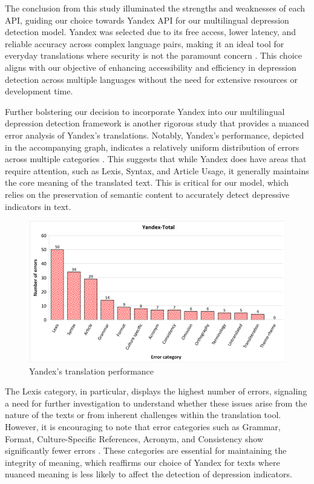 The conclusion from this study illuminated the strengths and weaknesses of each API, guiding our choice towards Yandex API for our multilingual depression detection model. Yandex was selected due to its free access, lower latency, and reliable accuracy across complex language pairs, making it an ideal tool for everyday translations where security is not the paramount concern \cite{rashmi2020comparison}. This choice aligns with our objective of enhancing accessibility and efficiency in depression detection across multiple languages without the need for extensive resources or development time.

Further bolstering our decision to incorporate Yandex into our multilingual depression detection framework is another rigorous study that provides a nuanced error analysis of Yandex's translations. Notably, Yandex's performance, depicted in the accompanying graph, indicates a relatively uniform distribution of errors across multiple categories \cite{cambedda2021study}. This suggests that while Yandex does have areas that require attention, such as Lexis, Syntax, and Article Usage, it generally maintains the core meaning of the translated text. This is critical for our model, which relies on the preservation of semantic content to accurately detect depressive indicators in text.

\begin{figure}[htbp]
	\centering
		\includegraphics[scale=0.65]{LaTeX Bachelor Thesis Depression Signs Detection/figures/Yandex's-translation-performace.png}
	\caption{Yandex's translation performance \cite{cambedda2021study}}
	\label{FigGloablDepression}
\end{figure}

The Lexis category, in particular, displays the highest number of errors, signaling a need for further investigation to understand whether these issues arise from the nature of the texts or from inherent challenges within the translation tool. However, it is encouraging to note that error categories such as Grammar, Format, Culture-Specific References, Acronym, and Consistency show significantly fewer errors \cite{cambedda2021study}. These categories are essential for maintaining the integrity of meaning, which reaffirms our choice of Yandex for texts where nuanced meaning is less likely to affect the detection of depression indicators.


